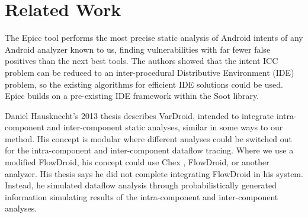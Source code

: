 {%



\vspace{-1.0ex}
\chapter{Related Work}
\label{sec:related-work}

The Epicc tool performs the most precise static analysis of Android intents of
any Android analyzer known to us, finding vulnerabilities with far fewer false
positives than the next best tools. 
The authors showed that the intent ICC
problem can be reduced to an inter-procedural Distributive Environment (IDE)
problem, so the  existing algorithms for efficient IDE solutions could be used.
Epicc builds on a pre-existing IDE framework within the Soot library.

Daniel Hausknecht's 2013 thesis \cite{hausknecht2013master} describes VarDroid,
intended to integrate intra-component and inter-component static analyses,
similar in some ways to our method. 
His concept is modular where different analyses could be switched out for the
intra-component and inter-component dataflow tracing. 
Where we use a modified FlowDroid, his concept could use Chex
\cite{lu2012chex}, FlowDroid, or another analyzer. His thesis says he did not
complete integrating FlowDroid in his system.  Instead, he simulated dataflow
analysis through probabilistically generated information simulating results of
the intra-component and inter-component analyses.

}
